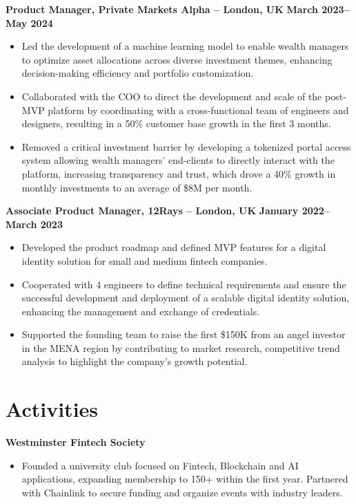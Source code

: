 \documentclass{article}
\begin{document}
\textbf{Product Manager, Private Markets Alpha -- London, UK} \hfill \textbf{March 2023--May 2024}
\begin{itemize}[leftmargin=*,noitemsep]
  \item Led the development of a machine learning model to enable wealth managers to optimize asset allocations across diverse investment themes, enhancing decision-making efficiency and portfolio customization.
  \item Collaborated with the COO to direct the development and scale of the post-MVP platform by coordinating with a cross-functional team of engineers and designers, resulting in a 50\% customer base growth in the first 3 months.
  \item Removed a critical investment barrier by developing a tokenized portal access system allowing wealth managers' end-clients to directly interact with the platform, increasing transparency and trust, which drove a 40\% growth in monthly investments to an average of \$8M per month.
\end{itemize}

\textbf{Associate Product Manager, 12Rays -- London, UK} \hfill \textbf{January 2022--March 2023}
\begin{itemize}[leftmargin=*,noitemsep]
  \item Developed the product roadmap and defined MVP features for a digital identity solution for small and medium fintech companies.
  \item Cooperated with 4 engineers to define technical requirements and ensure the successful development and deployment of a scalable digital identity solution, enhancing the management and exchange of credentials.
  \item Supported the founding team to raise the first \$150K from an angel investor in the MENA region by contributing to market research, competitive trend analysis to highlight the company's growth potential.
\end{itemize}

\section*{Activities}
\textbf{Westminster Fintech Society}
\begin{itemize}[leftmargin=*,noitemsep]
  \item Founded a university club focused on Fintech, Blockchain and AI applications, expanding membership to 150+ within the first year. Partnered with Chainlink to secure funding and organize events with industry leaders.
\end{itemize}
\end{document}
